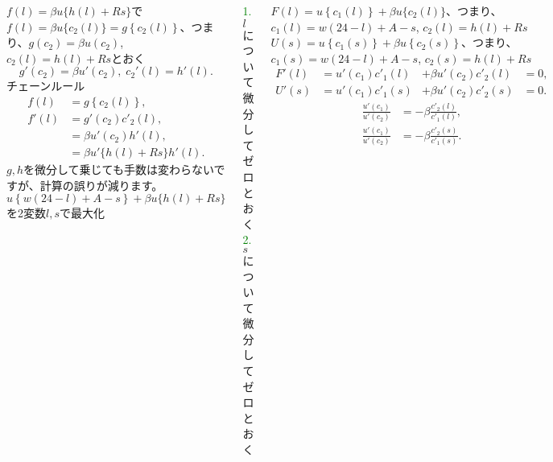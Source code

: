 \begin{frame}[t]{}
\begin{columns}[T]
$f(l)=\beta u\{h(l)+Rs\}$で$f(l)=\beta u\{c_{2}(l)\}=g\left\{c_{2}(l)\right\}$、つまり、$g(c_{2})=\beta u(c_{2})$, $c_{2}(l)=h(l)+Rs$とおく
\[
g'(c_{2})=\beta u'(c_{2}), \; c_{2}'(l)=h'(l).
\]
チェーンルール
\[
\begin{aligned}
f(l)
&=
g\left\{c_{2}(l)\right\},\\
f'(l)
&=
g'(c_{2})c'_{2}(l),\\
&=
\beta u'(c_{2})h'(l),\\
&=
\beta u'\{h(l)+Rs\}h'(l).
\end{aligned}
\]
\pause
$g, h$を微分して乗じても手数は変わらないですが、計算の誤りが減ります。
\pause
$u\left\{w(24-l)+A-s\right\}+\beta u\{h(l)+Rs\}$を2変数$l, s$で最大化

\pause
{\tiny \textcolor{green}{1.} $l$について微分してゼロとおく \; \textcolor{green}{2.} $s$について微分してゼロとおく}

\pause
$F(l)=u\left\{c_{1}(l)\right\}+\beta u\{c_{2}(l)\}$、つまり、$c_{1}(l)=w(24-l)+A-s$, $c_{2}(l)=h(l)+Rs$
\pause
$U(s)=u\left\{c_{1}(s)\right\}+\beta u\left\{c_{2}(s)\right\}$、つまり、$c_{1}(s)=w(24-l)+A-s$, $c_{2}(s)=h(l)+Rs$
\pause
\[
\begin{aligned}
F'(l)
&=
u'\left(c_{1}\right)c'_{1}(l)&+\beta u'(c_{2})c'_{2}(l)&=0,\\
U'(s)
&=
u'\left(c_{1}\right)c'_{1}(s)&+\beta u'(c_{2})c'_{2}(s)&=0.
\end{aligned}
\]
\[
\begin{aligned}
\frac{u'\left(c_{1}\right)}{u'\left(c_{2}\right)}&=-\beta \frac{c'_{2}(l)}{c'_{1}(l)}, \\
\frac{u'\left(c_{1}\right)}{u'\left(c_{2}\right)}&=-\beta \frac{c'_{2}(s)}{c'_{1}(s)}. 
\end{aligned}
\]
\end{columns}
\end{frame}

